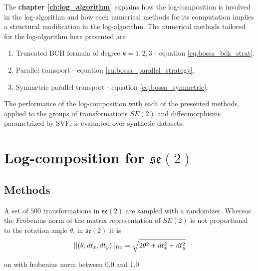 The {\bf chapter \ref{ch:log_algorithm}} explains how the log-composition is involved in the log-algorithm and how each numerical methods for its computation implies a structural modification in the log-algorithm. The numerical methods tailored for the log-algorithm here presented are
\begin{enumerate}
	\item Truncated BCH formula of degree $k=1,2,3$ - equation \ref{eq:bossa_bch_strat}.
	\item Parallel transport - equation \ref{eq:bossa_parallel_strategy}.
	\item Symmetric parallel transport - equation \ref{eq:bossa_symmetric}.
\end{enumerate}

The performance of the log-composition with each of the presented methods, applied to the groups of transformations $SE(2)$ and diffeomorphisms parametrized by SVF, is evaluated over synthetic datasets.

\section{Log-composition for $\mathfrak{se}(2)$}

\subsection{Methods}

A set of $500$ transformations in $\mathfrak{se}(2)$ are sampled with a randomizer. Whereas the Frobenius norm of the matrix representation of $SE(2)$ is not proportional to the rotation angle $\theta$, in $\mathfrak{se}(2)$ it is
\begin{align*}
\vert\lvert (\theta,dt_{x},dt_{y}) \rvert\vert_{\text{fro}} = \sqrt{2\theta^{2} + dt_{x}^2 + dt_{y}^2} 
\end{align*}




on with frobenius norm between $0.0$ and $1.0$


